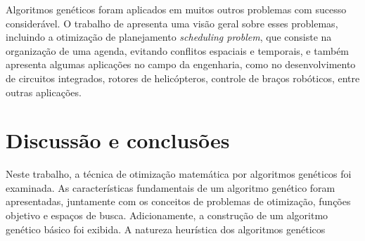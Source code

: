 \documentclass[12pt]{article}
\begin{document}
Algoritmos genéticos foram aplicados em muitos outros problemas com sucesso considerável. O trabalho de \cite{Ross1994} apresenta uma visão geral sobre esses problemas, incluindo a otimização de planejamento \textit{scheduling problem}, que consiste na organização de uma agenda, evitando conflitos espaciais e temporais, e também apresenta algumas aplicações no campo da engenharia, como no desenvolvimento de circuitos integrados, rotores de helicópteros, controle de braços robóticos, entre outras aplicações.

\section{Discussão e conclusões} \label{sec:conclusions}

Neste trabalho, a técnica de otimização matemática por algoritmos genéticos foi examinada. As características fundamentais de um algoritmo genético foram apresentadas, juntamente com os conceitos de problemas de otimização, funções objetivo e espaços de busca. Adicionamente, a construção de um algoritmo genético básico foi exibida.
A natureza heurística dos algoritmos genéticos 



\end{document}
